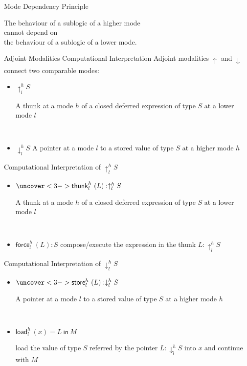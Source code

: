 \documentclass[letterpaper,12pt,aspectratio=169,show notes,dvipsnames]{beamer}
\newcommand{\tyUp}[3]{{\uparrow^{#1}_{#2} #3}}
\newcommand{\tyDown}[3]{{\downarrow^{#1}_{#2} #3}}
\newcommand{\tmLiftName}{{\mathsf{thunk}}}
\newcommand{\tmLift}[3]{{\tmLiftName^{#1}_{#2}\ (#3)}}
\newcommand{\tmUnthunkName}{{\mathsf{force}}}
\newcommand{\tmUnthunk}[3]{{\tmUnthunkName^{#1}_{#2}\ (#3)}}
\newcommand{\tmReturnName}{{\mathsf{store}}}
\newcommand{\tmReturn}[3]{{\tmReturnName^{#1}_{#2}\ (#3)}}
\newcommand{\tmLetreturnName}{{\mathsf{load}}}
\newcommand{\tmLetreturn}[5]{{\tmLetreturnName^{#1}_{#2}\ (#3) = #4\ \mathsf{in}\ #5}}
\begin{document}
\begin{frame}{Mode Dependency Principle}
  \color{black}
  \begin{center}
	The behaviour of a sublogic of {\color{violet}a higher mode}\\cannot depend on\\the behaviour of a sublogic of {\color{violet}a lower mode}.
  \end{center}
\end{frame}

\begin{frame}{Adjoint Modalities \textemdash Computational Interpretation}
  \color{black}
  Adjoint modalities \(\tyUp{}{}{}\) and \(\tyDown{}{}{}\) connect two comparable modes:
  \pause
  \begin{itemize}[<+->]
  \item \(\tyUp{h}{l}{S}\) \textemdash{} \parbox{25em}{A thunk at a mode \(h\) of a closed deferred expression of type \(S\) at a lower mode \(l\)}\\[1em]
  \item \(\tyDown{h}{l}{S}\) \textemdash{} A pointer at a mode \(l\) to a stored value of type \(S\) at a higher mode \(h\)
  \end{itemize}
\end{frame}

\begin{frame}{Computational Interpretation of \(\tyUp{h}{l}{S}\)}
  \color{black}
  \pause
  \begin{itemize}
  \item<2-> \(\uncover<3->{\tmLift{h}{l}{L} : }\tyUp{h}{l}{S}\) \textemdash{} \parbox{22em}{A thunk at a mode \(h\) of a closed deferred expression  of type \(S\) at a lower mode \(l\)}\\[1em]
  \item<4-> \(\tmUnthunk{h}{l}{L} : S\) \textemdash{} compose/execute the expression in the thunk \(L : \tyUp{h}{l}{S}\)
  \end{itemize}
\end{frame}

\begin{frame}{Computational Interpretation of \(\tyDown{h}{l}{S}\)}
  \color{black}
  \pause
  \begin{itemize}
  \item<2-> \(\uncover<3->{\tmReturn{h}{l}{L} : }\tyDown{h}{l}{S}\) \textemdash{} \parbox{18em}{A pointer at a mode \(l\) to a stored value  of type \(S\) at a higher mode \(h\)}\\[1em]
  \item<4-> \(\tmLetreturn{h}{l}{x}{L}{M}\) \textemdash{} \parbox{19em}{load the value of type \(S\) referred by the pointer \(L : \tyDown{h}{l}{S}\) into \(x\) and continue with \(M\)}
  \end{itemize}
\end{frame}
\end{document}
